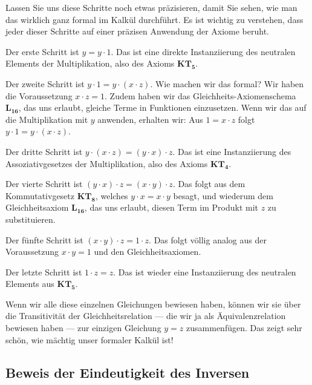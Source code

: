 \begin{spoken-clean}[01:11:42 - 01:14:42]
Lassen Sie uns diese Schritte noch etwas präzisieren, damit Sie sehen, wie man das wirklich ganz formal im Kalkül durchführt. Es ist wichtig zu verstehen, dass jeder dieser Schritte auf einer präzisen Anwendung der Axiome beruht. 

Der erste Schritt ist $y = y \cdot 1$. Das ist eine direkte Instanziierung des neutralen Elements der Multiplikation, also des Axioms $\mathbf{KT_5}$. 

Der zweite Schritt ist $y \cdot 1 = y \cdot (x \cdot z)$. Wie machen wir das formal? Wir haben die Voraussetzung $x \cdot z = 1$. Zudem haben wir das Gleichheits-Axiomenschema $\mathbf{L_{16}}$, das uns erlaubt, gleiche Terme in Funktionen einzusetzen. Wenn wir das auf die Multiplikation mit $y$ anwenden, erhalten wir: Aus $1 = x \cdot z$ folgt $y \cdot 1 = y \cdot (x \cdot z)$. 

Der dritte Schritt ist $y \cdot (x \cdot z) = (y \cdot x) \cdot z$. Das ist eine Instanziierung des Assoziativgesetzes der Multiplikation, also des Axioms $\mathbf{KT_4}$. 

Der vierte Schritt ist $(y \cdot x) \cdot z = (x \cdot y) \cdot z$. Das folgt aus dem Kommutativgesetz $\mathbf{KT_8}$, welches $y \cdot x = x \cdot y$ besagt, und wiederum dem Gleichheitsaxiom $\mathbf{L_{16}}$, das uns erlaubt, diesen Term im Produkt mit $z$ zu substituieren. 

Der fünfte Schritt ist $(x \cdot y) \cdot z = 1 \cdot z$. Das folgt völlig analog aus der Voraussetzung $x \cdot y = 1$ und den Gleichheitsaxiomen. 

Der letzte Schritt ist $1 \cdot z = z$. Das ist wieder eine Instanziierung des neutralen Elements aus $\mathbf{KT_5}$. 

Wenn wir alle diese einzelnen Gleichungen bewiesen haben, können wir sie über die Transitivität der Gleichheitsrelation --- die wir ja als Äquivalenzrelation bewiesen haben --- zur einzigen Gleichung $y = z$ zusammenfügen. Das zeigt sehr schön, wie mächtig unser formaler Kalkül ist!
\end{spoken-clean}

\subsection{Beweis der Eindeutigkeit des Inversen}

